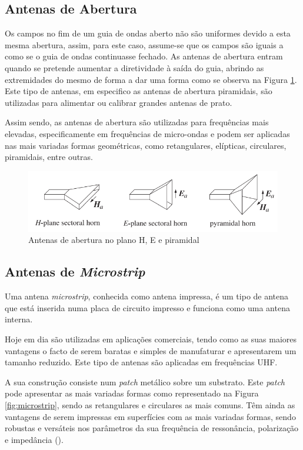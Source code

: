\subsection*{Antenas de Abertura}
Os campos no fim de um guia de ondas aberto não são uniformes devido a esta mesma abertura, assim, para este caso, assume-se que os campos são iguais a como se o guia de ondas continuasse fechado. As antenas de abertura entram quando se pretende aumentar a diretividade à saída do guia, abrindo as extremidades do mesmo de forma a dar uma forma como se observa na Figura \ref{fig:aperture antenna2}. Este tipo de antenas, em especifico as antenas de abertura piramidais, são utilizadas para alimentar ou calibrar grandes antenas de prato.\par
Assim sendo, as antenas de abertura são utilizadas para frequências mais elevadas, especificamente em frequências de micro-ondas e podem ser aplicadas nas mais variadas formas geométricas, como retangulares, elípticas, circulares, piramidais, entre outras.

\begin{figure}[h]
\centering
\includegraphics[scale=0.6]{chapters/ch3/assets/aperture_antenna2}
\decoRule
\caption[Antena de Abertura]{Antenas de abertura no plano H, E e piramidal}
\label{fig:aperture antenna2}
\end{figure}


\subsection*{Antenas de \textit{Microstrip}}
Uma antena \textit{microstrip}, conhecida como antena impressa, é um tipo de antena que está inserida numa placa de circuito impresso e funciona como uma antena interna.\par
Hoje em dia são utilizadas em aplicações comerciais, tendo como as suas maiores vantagens o facto de serem baratas e simples de manufaturar e apresentarem um tamanho reduzido. Este tipo de antenas são aplicadas em frequências \gls{UHF}.\par 
A sua construção consiste num \textit{patch} metálico sobre um substrato. Este \textit{patch} pode apresentar as mais variadas formas como representado na Figura \ref{fig:microstrip}, sendo as retangulares e circulares as mais comuns. Têm ainda as vantagens de serem impressas em superfícies com as mais variadas formas, sendo robustas e versáteis nos parâmetros da sua frequência de ressonância, polarização e impedância (\cite{Balanis2016}).

